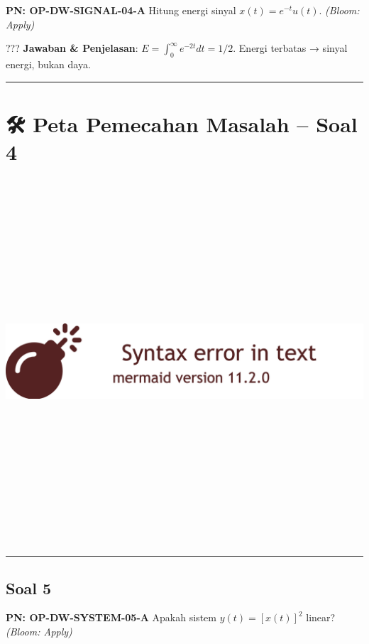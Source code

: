 \documentclass[
  letterpaper,
  DIV=11,
  numbers=noendperiod]{scrreprt}
\begin{document}
\textbf{PN: OP-DW-SIGNAL-04-A} Hitung energi sinyal \(x(t)=e^{-t}u(t)\).
\emph{(Bloom: Apply)}

??? \textbf{Jawaban \& Penjelasan}:
\(E=\int_0^\infty e^{-2t} dt = 1/2\). Energi terbatas → sinyal energi,
bukan daya.

\begin{center}\rule{0.5\linewidth}{0.5pt}\end{center}

\section{🛠️ Peta Pemecahan Masalah -- Soal
4}\label{peta-pemecahan-masalah-soal-4}

\includegraphics[width=25.13in,height=5.33in]{kuliah/Peta_1_files/figure-latex/mermaid-figure-4.png}

\begin{center}\rule{0.5\linewidth}{0.5pt}\end{center}

\subsection{Soal 5}\label{soal-5}

\textbf{PN: OP-DW-SYSTEM-05-A} Apakah sistem \(y(t)=[x(t)]^2\) linear?
\emph{(Bloom: Apply)}
\end{document}
